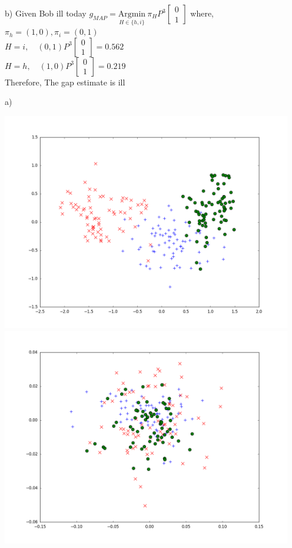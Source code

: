 \documentclass[11pt]{article}
\newenvironment{problem}[2][Problem]{\begin{trivlist}
\item[\hskip \labelsep {\bfseries #1}\hskip \labelsep {\bfseries #2.}]}{\end{trivlist}}
\begin{document}
b) Given Bob ill today $g_{MAP} = \underset{H \in \{h, i\}} {\mathrm{Argmin}} ~ \pi_H P^3 \begin{bmatrix}
0\\1
\end{bmatrix} $ where, $\pi_h = (1,0), \pi_i = (0,1)$\\
$H =i, \quad (0,1) P^3\begin{bmatrix} 0\\1 \end{bmatrix} = 0.562$ \\
$H = h, \quad (1,0) P^3\begin{bmatrix} 0\\1 \end{bmatrix} = 0.219$\\
Therefore, The gap estimate is ill\\

\begin{problem}{4}
\end{problem}
a) 

\includegraphics[width = 5in]{f} \\ \includegraphics[width = 5in]{l}
\end{document}
